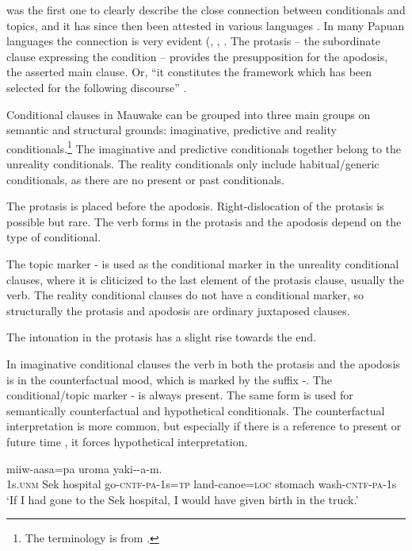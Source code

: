 \citet{Haiman1978} was the first one to clearly describe the close connection between conditionals and topics, and it has since then been attested in various languages \citep[292]{ThompsonEtAl2007}. In many Papuan languages the connection is very evident (\citealt[235--244]{Reesink1987}, \citealt[304--308]{MacDonald1990}, \citealt[263]{Farr1999}. The protasis -- the subordinate clause expressing the condition -- provides the presupposition for the apodosis, the asserted main clause. Or, ``it constitutes the framework which has been selected for the following discourse'' \citep[585]{Haiman1978}.

Conditional clauses in Mauwake can be grouped into three main groups on semantic and structural grounds: imaginative, predictive and reality conditionals.\footnote{The terminology is from \citet[255]{ThompsonEtAl2007}.} The imaginative and predictive conditionals together belong to the unreality conditionals. The reality conditionals only include habitual/generic conditionals, as there are no present or past conditionals.

The protasis is placed before the apodosis. Right-dislocation of the protasis is possible but rare. The verb forms in the protasis and the apodosis depend on the type of conditional.

The topic marker - is used as the conditional marker in the unreality conditional clauses, where it is cliticized to the last element of the protasis clause, usually the verb. The reality conditional clauses do not have a conditional marker, so structurally the protasis and apodosis are ordinary juxtaposed clauses. 

The intonation in the protasis has a slight rise towards the end.  

In imaginative conditional clauses the verb in both the protasis and the apodosis is in the counterfactual mood, which is marked by the suffix -. The conditional/topic marker - is always present. The same form is used for semantically counterfactual and hypothetical conditionals. The counterfactual interpretation  is more common, but especially if there is a reference to present  or future time , it forces hypothetical interpretation.

\ea%
\label{ex:8:x1645}
\gll [Yo  Sek  haussik  ikiw-\textstyleEmphasizedVernacularWords{ek}-a-m=\textstyleEmphasizedVernacularWords{na}]  miiw-aasa=pa uroma  yaki--a-m.\\
1s.\textsc{unm}  Sek  hospital  go-\textsc{cntf}-\textsc{pa}-1s=\textsc{tp} land-canoe=\textsc{loc} stomach  wash-\textsc{cntf}-\textsc{pa}-1s\\
\glt`If I had gone to the Sek hospital, I would have given birth in the truck.'
\z


